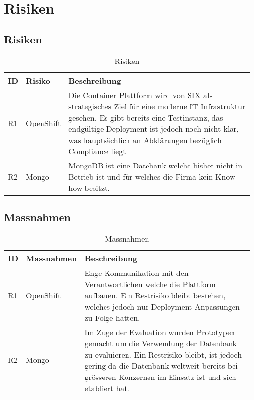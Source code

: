 \chapter{Risiken}

\section{Risiken}

\begin{table}[h!]
	\centering
	\caption{Risiken}
	\begin{tabular}{ | p{1cm} | p{3cm} | p{10cm} |}
		\toprule
		{\textbf{ID}} & {\textbf{Risiko}} & {\textbf{Beschreibung} } \\
		\midrule
		R1 & OpenShift & Die Container Plattform wird von SIX als strategisches Ziel für eine moderne IT Infrastruktur gesehen. Es gibt bereits eine Testinstanz, das endgültige Deployment ist jedoch noch nicht klar, was hauptsächlich an Abklärungen bezüglich Compliance liegt.  \\ \hline
		R2 & Mongo & MongoDB ist eine Datebank welche bisher nicht in Betrieb ist und für welches die Firma kein Know-how besitzt.\\
		\bottomrule
	\end{tabular}
\end{table}

\section{Massnahmen}
\begin{table}[h!]
	\centering
	\caption{Massnahmen}
	\begin{tabular}{ | p{1cm} | p{3cm} | p{10cm} | }
		\toprule
		{\textbf{ID}} & {\textbf{Massnahmen}} & {\textbf{Beschreibung}} \\
		\midrule
		R1 & OpenShift & Enge Kommunikation mit den Verantwortlichen welche die Plattform aufbauen. Ein Restrisiko bleibt bestehen, welches jedoch nur Deployment Anpassungen zu Folge hätten. \\ \hline
		R2 & Mongo & Im Zuge der Evaluation wurden Prototypen gemacht um die Verwendung der Datenbank zu evaluieren. Ein Restrisiko bleibt, ist jedoch gering da die Datenbank weltweit bereits bei grösseren Konzernen im Einsatz ist und sich etabliert hat. \\
		\bottomrule
	\end{tabular}
\end{table}